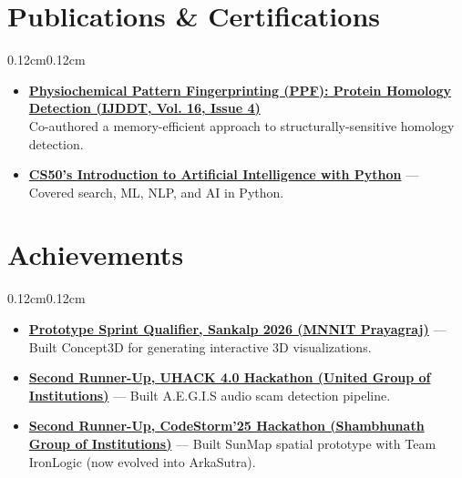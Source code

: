 \documentclass[10pt, letterpaper]{article}
\newenvironment{onecolentry}
{\begin{adjustwidth}{0.12cm}{0.12cm}}
{\end{adjustwidth}}
\begin{document}
\section{Publications \& Certifications}
\begin{onecolentry}
\begin{itemize}[leftmargin=0.36cm, itemsep=1pt]

\item \href{https://impactfactor.org/PDF/IJDDT/16/IJDDT,Vol16,Issue43s,Article31.pdf}{\textbf{Physiochemical Pattern Fingerprinting (PPF): Protein Homology Detection (IJDDT, Vol. 16, Issue 4)}} \\
Co-authored a memory-efficient approach to structurally-sensitive homology detection.

\item \href{https://cs50.harvard.edu/certificates/110613e9-87d7-4464-9897-63780847a793}{\textbf{CS50's Introduction to Artificial Intelligence with Python}} — Covered search, ML, NLP, and AI in Python.

\end{itemize}
\end{onecolentry}

\section{Achievements}
\begin{onecolentry}
\begin{itemize}[leftmargin=0.36cm, itemsep=0pt]

\item \href{https://www.linkedin.com/posts/mohammad-huzaifa-137939322_sankalp2026-hackathon-ai-activity-7444606593750495232-Tp3I}{\textbf{Prototype Sprint Qualifier, Sankalp 2026 (MNNIT Prayagraj)}} — Built Concept3D for generating interactive 3D visualizations.

\item \href{https://www.linkedin.com/posts/mohammad-huzaifa-137939322_productdesign-uiux-appdevelopment-activity-7440709280879603712-ypPo}{\textbf{Second Runner-Up, UHACK 4.0 Hackathon (United Group of Institutions)}} — Built A.E.G.I.S audio scam detection pipeline.

\item \href{https://www.linkedin.com/posts/mohammad-huzaifa-137939322_codestorm25-sunmap-hackathon-activity-7383512795281022977-Dele}{\textbf{Second Runner-Up, CodeStorm'25 Hackathon (Shambhunath Group of Institutions)}} — Built SunMap spatial prototype with Team IronLogic (now evolved into ArkaSutra).

\end{itemize}
\end{onecolentry}
\end{document}

